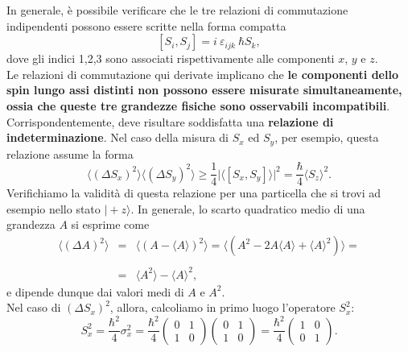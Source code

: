 In generale, è possibile verificare che le tre relazioni di commutazione indipendenti possono essere scritte nella forma compatta
\begin{equation}
\left[ S_i , S_j\right] = i\ \varepsilon_{ijk}\ \hbar S_k,
\end{equation}
dove gli indici 1,2,3 sono associati rispettivamente alle componenti $x$, $y$ e $z$.\\
Le relazioni di commutazione qui derivate implicano che \textbf{le componenti dello spin lungo assi distinti non possono essere misurate simultaneamente, ossia che queste tre grandezze fisiche sono osservabili incompatibili}. Corrispondentemente, deve risultare soddisfatta una \textbf{relazione di indeterminazione}. Nel caso della misura di $S_x$ ed $S_y$, per esempio, questa relazione assume la forma
\begin{equation}
\label{eq:cap4_6}
\langle (\Delta S_x) ^2 \rangle \langle (\Delta S_y) ^2 \rangle \geq \frac{1}{4} \vert \langle \left[ S_x , S_y \right] \rangle \vert ^2 = \frac{\hbar}{4} \langle S_z \rangle ^2 .
\end{equation}
Verifichiamo la validità di questa relazione per una particella che si trovi ad esempio nello stato $\vert +z\rangle$. In generale, lo scarto quadratico medio di una grandezza $A$ si esprime come
\begin{eqnarray}
\langle (\Delta A ) ^2 \rangle & = & \langle (A- \langle A \rangle ) ^2 \rangle = \langle (A^2-2A\langle A \rangle + \langle A \rangle ^2) \rangle = \nonumber \\
\\
& = & \langle A^2\rangle - \langle A \rangle ^2, \nonumber
\end{eqnarray}
e dipende dunque dai valori medi di $A$ e $A^2$.\\
Nel caso di $(\Delta S_x) ^2$, allora, calcoliamo in primo luogo l'operatore $S_x ^2$:
\begin{equation}
S_x ^2 = \frac{\hbar ^2}{4} \sigma _x ^2=\frac{\hbar ^2}{4} \begin{pmatrix}
0 & 1 \\
1 & 0
\end{pmatrix} \begin{pmatrix}
0 & 1 \\
1 & 0
\end{pmatrix} = \frac{\hbar ^2}{4}\begin{pmatrix}
1 & 0 \\
0 & 1
\end{pmatrix}.
\end{equation}

